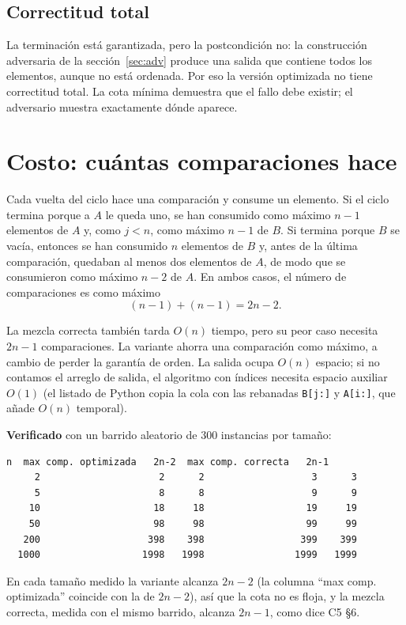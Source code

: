 \documentclass[11pt]{article}
\begin{document}
\subsection*{Correctitud total}

La terminación está garantizada, pero la postcondición no: la construcción adversaria de la sección~\ref{sec:adv}
produce una salida que contiene todos los elementos, aunque no está ordenada. Por eso la versión optimizada
no tiene correctitud total. La cota mínima demuestra que el fallo debe existir; el adversario muestra
exactamente dónde aparece.

\section{Costo: cuántas comparaciones hace}\label{sec:costo}

Cada vuelta del ciclo hace una comparación y consume un elemento. Si el ciclo termina porque a $A$ le queda
uno, se han consumido como máximo $n-1$ elementos de $A$ y, como $j<n$, como máximo $n-1$ de $B$. Si termina
porque $B$ se vacía, entonces se han consumido $n$ elementos de $B$ y, antes de la última comparación,
quedaban al menos dos elementos de $A$, de modo que se consumieron como máximo $n-2$ de $A$. En ambos casos,
el número de comparaciones es como máximo
\[
(n-1)+(n-1)=2n-2.
\]

La mezcla correcta también tarda $O(n)$ tiempo, pero su peor caso necesita $2n-1$ comparaciones. La variante
ahorra una comparación como máximo, a cambio de perder la garantía de orden. La salida ocupa $O(n)$ espacio;
si no contamos el arreglo de salida, el algoritmo con índices necesita espacio auxiliar $O(1)$ (el listado de
Python copia la cola con las rebanadas \texttt{B[j:]} y \texttt{A[i:]}, que añade $O(n)$ temporal).

\textbf{Verificado} con un barrido aleatorio de 300 instancias por tamaño:
\begin{lstlisting}[style=salida]
     n  max comp. optimizada   2n-2  max comp. correcta   2n-1
     2                     2      2                   3      3
     5                     8      8                   9      9
    10                    18     18                  19     19
    50                    98     98                  99     99
   200                   398    398                 399    399
  1000                  1998   1998                1999   1999
\end{lstlisting}
En cada tamaño medido la variante alcanza $2n-2$ (la columna ``max comp. optimizada'' coincide con la de $2n-2$), así que la
cota no es floja, y la mezcla correcta, medida con el mismo barrido, alcanza $2n-1$, como dice C5 §6.
\end{document}
